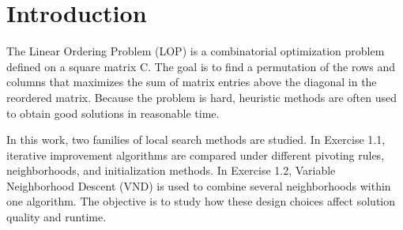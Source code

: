 \section{Introduction}
The Linear Ordering Problem (LOP) is a combinatorial optimization problem defined on a square matrix C. The goal is to find a permutation of the rows and columns that maximizes the sum of matrix entries above the diagonal in the reordered matrix. Because the problem is hard, heuristic methods are often used to obtain good solutions in reasonable time.

In this work, two families of local search methods are studied. In Exercise 1.1, iterative improvement algorithms are compared under different pivoting rules, neighborhoods, and initialization methods. In Exercise 1.2, Variable Neighborhood Descent (VND) is used to combine several neighborhoods within one algorithm. The objective is to study how these design choices affect solution quality and runtime.